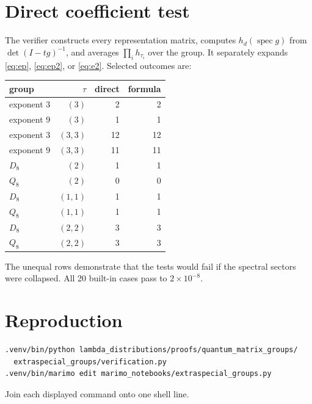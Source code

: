 \documentclass[11pt]{article}
\begin{document}
\section{Direct coefficient test}
The verifier constructs every representation matrix, computes
$h_d(\operatorname{spec}g)$ from $\det(I-tg)^{-1}$, and averages
$\prod_i h_{\tau_i}$ over the group.  It separately expands
\eqref{eq:ep}, \eqref{eq:ep2}, or \eqref{eq:e2}.  Selected outcomes are:
\begin{center}
\begin{tabular}{@{}lrrr@{}}\toprule
group & $\tau$ & direct & formula\\\midrule
exponent $3$ & $(3)$&2&2\\
exponent $9$ & $(3)$&1&1\\
exponent $3$ & $(3,3)$&12&12\\
exponent $9$ & $(3,3)$&11&11\\
$D_8$ & $(2)$&1&1\\
$Q_8$ & $(2)$&0&0\\
$D_8$ & $(1,1)$&1&1\\
$Q_8$ & $(1,1)$&1&1\\
$D_8$ & $(2,2)$&3&3\\
$Q_8$ & $(2,2)$&3&3\\\bottomrule
\end{tabular}
\end{center}
The unequal rows demonstrate that the tests would fail if the spectral
sectors were collapsed.  All 20 built-in cases pass to $2\times10^{-8}$.

\section{Reproduction}
\begin{verbatim}
.venv/bin/python lambda_distributions/proofs/quantum_matrix_groups/
  extraspecial_groups/verification.py
.venv/bin/marimo edit marimo_notebooks/extraspecial_groups.py
\end{verbatim}
Join each displayed command onto one shell line.
\end{document}
